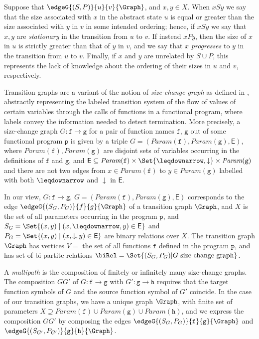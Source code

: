 Suppose that $\edgeG{(S,P)}{u}{v}{\Graph}$, and $x, y \in X$. When $x S y$ we say that the size associated with $x$ in the abstract state $u$ is equal or greater than the size associated with $y$ in $v$ in some intended ordering; hence, if $x S y$ we say that 
$x,y$ are {\em stationary} in the transition from $u$ to $v$. If instead  $x P y$, then the size of $x$ in $u$ is strictly greater than that of $y$ in $v$, and 
we say that $x$ {\em progresses} to $y$ in the transition from $u$ to $v$. 
Finally, if $x$ and $y$ are unrelated by $S \cup P$, this
represents the lack of knowledge about the ordering of their sizes in $u$ and $v$, respectively.

\medskip
Transition graphs are a variant of the notion of {\em size-change graph} as defined in \cite[Def. 2.1]{Lee3}, abstractly representing the labeled transition system of the flow of values of certain variables through the calls of functions in a functional program, where labels convey the information needed to detect termination.
More precisely, a size-change graph $G:\texttt{f} \to \texttt{g}$ for a pair of function names $\texttt{f}$, 
$\texttt{g}$ out of some functional program $\texttt{p}$
is given by a triple $G = (\textit{Param}(\texttt{f}), \textit{Param}(\texttt{g}), \textsf{E})$, where $\textit{Param}(\texttt{f}), \textit{Param}(\texttt{g})$
are disjoint sets of variables occurring in the definitions of $\texttt{f}$ and $\texttt{g}$, and $\textsf{E} \subseteq \textit{Param}(\texttt{f}) \times \Set{\leqdownarrow, \downarrow} \times \textit{Param}(\texttt{g})$ and there are not two edges from $x \in \textit{Param}(\texttt{f})$ to
$y \in \textit{Param}(\texttt{g})$ labelled with both $\leqdownarrow$ and
$\downarrow$ in $\textsf{E}$.

In our view, $G:\texttt{f} \to \texttt{g}$, 
$G = (\textit{Param}(\texttt{f}), \textit{Param}(\texttt{g}), \textsf{E})$ corresponds 
to the edge $\edgeG{(S_G,P_G)}{f}{g}{\Graph}$ of a transition graph $\Graph$, and
$X$ is the set of all parameters occurring in the program $\texttt{p}$, 
and $S_G = \Set{(x,y) \mid (x, \leqdownarrow, y) \in \textsf{E}}$ and 
$P_G = \Set{(x,y) \mid (x, \downarrow, y) \in \textsf{E}}$ are binary relations over $X$.
The transition graph $\Graph$ has vertices $V=$ the set of all functions $\texttt{f}$
defined in the program $\texttt{p}$, and has set of
bi-partite relations $\biRel = \Set{(S_G,P_G) | G \mbox{ size-change graph}}$.


A {\em multipath} \cite[Def. 2.3]{Lee3} is the composition of finitely or infinitely many size-change graphs. 
The composition $GG'$ of $G:\texttt{f} \to \texttt{g}$ with $G':\texttt{g} \to \texttt{h}$
requires that the target function symbols of $G$ and the source function symbol of $G'$ coincide. 
In the case of our transition graphs, we have a unique graph $\Graph$, with finite set of parameters $X \supseteq
 \textit{Param}(\texttt{f}) \cup \textit{Param}(\texttt{g}) \cup \textit{Param}(\texttt{h})$,
and we express the composition $GG'$ by composing 
the edges $\edgeG{(S_G,P_G)}{\texttt{f}}{\texttt{g}}{\Graph}$ and  
$\edgeG{(S_{G'},P_{G'})}{\texttt{g}}{\texttt{h}}{\Graph}$. 






